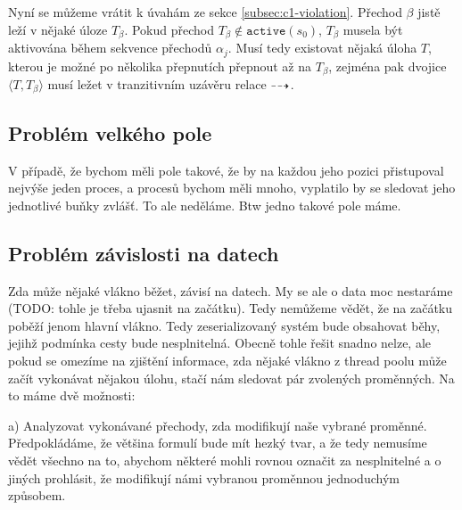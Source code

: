 \documentclass[10pt,a4paper,notitlepage]{report}
\newcommand{\tuple}[1]{\langle #1 \rangle}
\begin{document}
Nyní se můžeme vrátit k úvahám ze sekce \ref{subsec:c1-violation}. Přechod $\beta$ jistě leží v nějaké úloze $T_{\beta}$. Pokud přechod $T_{\beta} \not \in \texttt{active}(s_0)$, $T_{\beta}$ musela být aktivována během sekvence přechodů $\alpha_j$. Musí tedy existovat nějaká úloha $T$, kterou je možné po několika přepnutích přepnout až na $T_{\beta}$, zejména pak dvojice $\tuple{T, T_{\beta}}$ musí ležet v tranzitivním uzávěru relace $\dashrightarrow$.




\subsection{Problém velkého pole}
V případě, že bychom měli pole takové, že by na každou jeho pozici přistupoval nejvýše jeden proces,
a procesů bychom měli mnoho, vyplatilo by se sledovat jeho jednotlivé buňky zvlášť. To ale neděláme. Btw jedno takové pole máme.

\subsection{Problém závislosti na datech}
Zda může nějaké vlákno běžet, závisí na datech. My se ale o data moc nestaráme (TODO: tohle je třeba ujasnit na začátku). Tedy nemůžeme vědět, že na začátku poběží jenom hlavní vlákno. Tedy zeserializovaný systém bude obsahovat běhy, jejihž podmínka cesty bude nesplnitelná. Obecně tohle řešit snadno nelze, ale pokud se omezíme na zjištění informace, zda nějaké vlákno z thread poolu může začít vykonávat nějakou úlohu, stačí nám sledovat pár zvolených proměnných. Na to máme dvě možnosti:

a) Analyzovat vykonávané přechody, zda modifikují naše vybrané proměnné. Předpokládáme, že většina formulí bude mít hezký tvar, a že tedy nemusíme vědět všechno na to, abychom některé mohli rovnou označit za nesplnitelné a o jiných prohlásit, že modifikují námi vybranou proměnnou jednoduchým způsobem.
\end{document}
